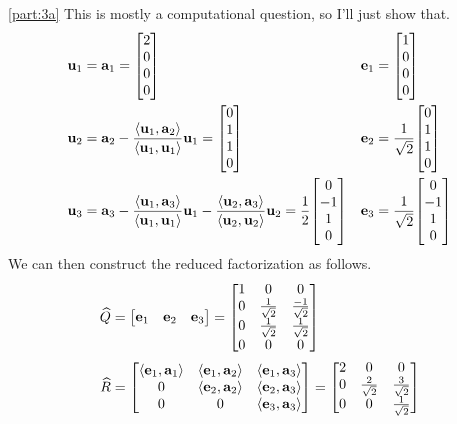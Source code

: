 \documentclass[boxes,pages]{homework}
\begin{document}
\begin{solution}
	\ref{part:3a}
	This is mostly a computational question, so I'll just show that.
	\begin{align*}
		\vb{u}_1 & = \vb{a}_1 =  \mqty[2 \\ 0 \\ 0 \\ 0] & \vb{e}_1 & = \mqty[1 \\ 0 \\ 0 \\ 0] \\
		\vb{u}_2 & = \vb{a}_2 - \frac{\langle\vb{u}_1, \vb{a}_2\rangle}{\langle\vb{u}_1, \vb{u}_1\rangle}\vb{u}_1 = \mqty[0 \\ 1 \\ 1 \\ 0] & \vb{e}_2 & = \frac{1}{\sqrt{2}}\mqty[0 \\ 1 \\ 1 \\ 0] \\
		\vb{u}_3 & = \vb{a}_3 - \frac{\langle\vb{u}_1, \vb{a}_3\rangle}{\langle\vb{u}_1, \vb{u}_1\rangle}\vb{u}_1 - \frac{\langle\vb{u}_2, \vb{a}_3\rangle}{\langle\vb{u}_2, \vb{u}_2\rangle}\vb{u}_2 =  \frac{1}{2}\mqty[0 \\ -1 \\ 1 \\ 0] & \vb{e}_3 & = \frac{1}{\sqrt{2}}\mqty[0 \\ -1 \\ 1 \\ 0]
	\end{align*}
	We can then construct the reduced factorization as follows.
	\begin{align*}
		\widehat{Q} & = \mqty[\vb{e}_1 & \vb{e}_2 & \vb{e}_3] = \mqty[1 & 0 & 0 \\ 0 & \frac{1}{\sqrt{2}} & \frac{-1}{\sqrt{2}} \\ 0 & \frac{1}{\sqrt{2}} & \frac{1}{\sqrt{2}} \\ 0 & 0 & 0] \\
		\widehat{R} & = \mqty[\langle\vb{e}_1,\vb{a}_1\rangle & \langle\vb{e}_1,\vb{a}_2\rangle & \langle\vb{e}_1,\vb{a}_3\rangle \\ 0 & \langle\vb{e}_2,\vb{a}_2\rangle & \langle\vb{e}_2,\vb{a}_3\rangle \\ 0 & 0 & \langle\vb{e}_3,\vb{a}_3\rangle] = \mqty[2 & 0 & 0 \\ 0 & \frac{2}{\sqrt{2}} & \frac{3}{\sqrt{2}} \\ 0 & 0 & \frac{1}{\sqrt{2}}]
	\end{align*}


\end{solution}
\end{document}
